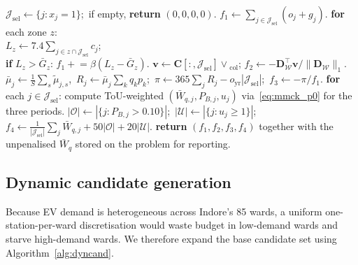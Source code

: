 \documentclass[conference]{IEEEtran}
\begin{document}
\begin{algorithm}[t]
\caption{\textsc{Evaluate}($\mathbf{x}$)}
\label{alg:evaluate}
\begin{algorithmic}[1]
  \STATE $\mathcal{J}_{\text{sel}}\gets\{j:x_j=1\}$;\ if empty, \textbf{return} $(0,0,0,0)$.
  \STATE $f_{1}\gets\sum_{j\in\mathcal{J}_{\text{sel}}}(o_j+g_j)$.
  \STATE \textbf{for} each zone $z$: \\
         \quad $L_{z}\gets 7.4\sum_{j\in z\cap\mathcal{J}_{\text{sel}}}c_j$; \\
         \quad \textbf{if} $L_z>\bar G_z$: $f_1\mathrel{+}=\beta(L_z-\bar G_z)$.
  \STATE $\mathbf{v}\gets\mathbf{C}[:,\mathcal{J}_{\text{sel}}]\!\vee\!_{\text{col}}$;
         $f_{2}\gets-\mathbf{D}_{\mathcal{W}}^{\!\top}\mathbf{v}\big/\|\mathbf{D}_{\mathcal{W}}\|_1$.
  \STATE $\bar\mu_{j}\!\gets\!\tfrac1S\sum_{s}\tilde\mu_{j,s}$,\
         $R_{j}\gets\bar\mu_{j}\sum_{k}q_{k}p_{k}$;\
         $\pi\gets 365\!\sum_{j}R_{j}-o_{\text{yr}}|\mathcal{J}_{\text{sel}}|$;\
         $f_{3}\gets-\pi / f_{1}$.
  \STATE \textbf{for} each $j\in\mathcal{J}_{\text{sel}}$: compute ToU-weighted
         $(\bar W_{q,j},P_{B,j},u_j)$ via~\eqref{eq:mmck_p0} for the three
         periods.
  \STATE $|\mathcal{O}|\gets|\{j:P_{B,j}\!>\!0.10\}|$;\
         $|\mathcal{U}|\gets|\{j:u_{j}\!\ge\!1\}|$;\
         $f_{4}\gets\tfrac1{|\mathcal{J}_{\text{sel}}|}\!\sum_j\!\bar W_{q,j}+50|\mathcal{O}|+20|\mathcal{U}|$.
  \STATE \textbf{return} $(f_{1},f_{2},f_{3},f_{4})$ together with the
         unpenalised $\bar W_{q}$ stored on the problem for
         reporting.
\end{algorithmic}
\end{algorithm}

\subsection{Dynamic candidate generation}
\label{subsec:dyncand}
Because EV demand is heterogeneous across Indore's 85 wards, a uniform
one-station-per-ward discretisation would waste budget in low-demand
wards and starve high-demand wards. We therefore expand the base
candidate set using Algorithm~\ref{alg:dyncand}.
\end{document}
